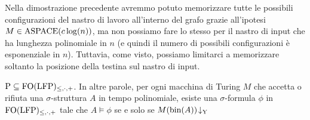 \begin{osservazione}
  Nella dimostrazione precedente avremmo potuto
  memorizzare tutte le possibili configurazioni del nastro di lavoro all'interno
  del grafo grazie all'ipotesi $M \in \operatorname{ASPACE}(c \log(n))$, ma non possiamo
  fare lo stesso per il nastro di input che ha lunghezza
  polinomiale in $n$ (e quindi il numero di possibili configurazioni è esponenziale in $n$).
  Tuttavia, come visto, possiamo limitarci a memorizzare soltanto la posizione
  della testina sul nastro di input.
\end{osservazione}

\begin{corollario}
\label{cor:P-subset-FO(LFP)}
 $\operatorname{P} \subseteq \operatorname{FO}(\operatorname{LFP})_{\leq,\cdot,+}$. In altre parole, per ogni macchina di Turing $M$ che accetta o
 rifiuta una $\sigma$-struttura $A$ in tempo polinomiale, esiste una
 $\sigma$-formula $\phi$ in $\operatorname{FO}(\operatorname{LFP})_{\leq,\cdot,+}$ tale che
 $A \models \phi$ se e solo se $M(\operatorname{bin}(A))\!\downarrow_{\text{Y}}$
\end{corollario}




